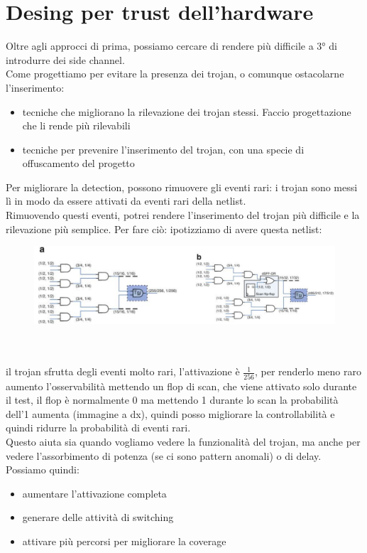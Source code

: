 \documentclass[oneside, 12pt]{extbook}
\begin{document}
\section{Desing per trust dell'hardware}
Oltre agli approcci di prima, possiamo cercare di rendere più difficile a 3° di introdurre dei side channel.\\
Come progettiamo per evitare la presenza dei trojan, o comunque ostacolarne l'inserimento:
\begin{itemize}
	\item tecniche che migliorano la rilevazione dei trojan stessi. Faccio progettazione che li rende più rilevabili
	\item tecniche per prevenire l'inserimento del trojan, con una specie di offuscamento del progetto
\end{itemize}
Per migliorare la detection, possono rimuovere gli eventi rari: i trojan sono messi lì in modo da essere attivati da eventi rari della netlist.
\\Rimuovendo questi eventi, potrei rendere l'inserimento del trojan più difficile e la rilevazione più semplice. Per fare ciò: ipotizziamo di avere questa netlist:\\
\begin{figure}[!h]
	\includegraphics[scale=0.3]{immagini/hardware/netlist_troj.png}
\end{figure}
\\\\il trojan sfrutta degli eventi molto rari, l'attivazione è $\frac{1}{256}$, per renderlo meno raro aumento l'osservabilità mettendo un flop di scan, che viene attivato solo durante il test, il flop è normalmente 0 ma mettendo 1 durante lo scan la probabilità dell'1 aumenta (immagine a dx), quindi posso migliorare la controllabilità e quindi ridurre la probabilità di eventi rari.
\\Questo aiuta sia quando vogliamo vedere la funzionalità del trojan, ma anche per vedere l'assorbimento di potenza (se ci sono pattern anomali) o di delay.
\\Possiamo quindi:
\begin{itemize}
	\item aumentare l'attivazione completa
	\item generare delle attività di switching
	\item attivare più percorsi per migliorare la coverage
\end{itemize}
\end{document}
